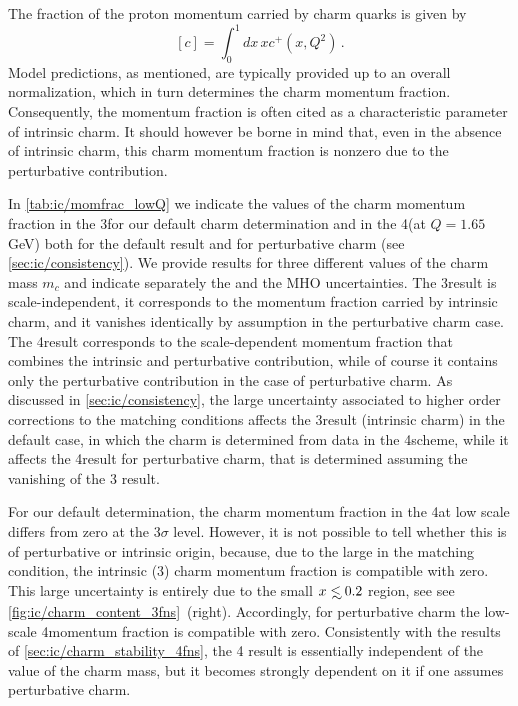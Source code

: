 
The fraction of the proton momentum carried by charm quarks is given by
\begin{equation}
\label{eq:ic/charm_momentum_fraction}
\left[ c\right] = \int_0^1dx\, x c^+(x,Q^2) \, .
\end{equation}
Model predictions, as mentioned, are typically provided up to an overall
normalization, which in turn determines the charm momentum fraction.
%
Consequently, the momentum fraction is often cited as a characteristic
parameter of intrinsic charm.
%
It should however be borne in mind that, even in the absence of intrinsic
charm, this charm momentum fraction is nonzero due to the perturbative
contribution.

In \cref{tab:ic/momfrac_lowQ} we indicate the values of the charm momentum
fraction in the 3\fns for our default charm determination and in the 4\fns  (at
$Q=1.65$ GeV) both for the default result and for perturbative charm \pdf (see
\cref{sec:ic/consistency}).
%
We provide results for  three different values of the charm mass $m_c$ and
indicate separately the \pdf and the MHO uncertainties.
%
The 3\fns result is scale-independent, it corresponds to the momentum fraction
carried by intrinsic charm, and it vanishes identically by assumption in the
perturbative charm case.
%
The 4\fns result corresponds to the scale-dependent momentum fraction that
combines the intrinsic and perturbative contribution, while of course it
contains only the perturbative contribution in the case of perturbative charm.
%
As discussed in \cref{sec:ic/consistency}, the large uncertainty associated to
higher order corrections to the matching conditions affects the 3\fns result
(intrinsic charm) in the default case, in which the charm \pdf is determined
from data in the 4\fns scheme, while it affects the 4\fns result for
perturbative charm, that is determined assuming the vanishing of the 3\fns
result.

For our default determination, the charm momentum fraction in the 4\fns at low
scale differs from zero at the $3\sigma$ level.
%
However, it is not possible to tell whether this is of perturbative or
intrinsic origin, because, due to  the large \mhou in the matching condition,
the intrinsic (3\fns) charm momentum fraction is compatible with zero. This
large uncertainty is entirely due to the small $x\lsim 0.2$ region, see see
\cref{fig:ic/charm_content_3fns}~(right).
%
Accordingly, for perturbative charm the low-scale 4\fns momentum fraction is
compatible with zero.
%
Consistently with the results of \cref{sec:ic/charm_stability_4fns}, the 4\fns
result is essentially independent of the value of the charm mass, but it
becomes strongly dependent on it if one assumes perturbative charm.

